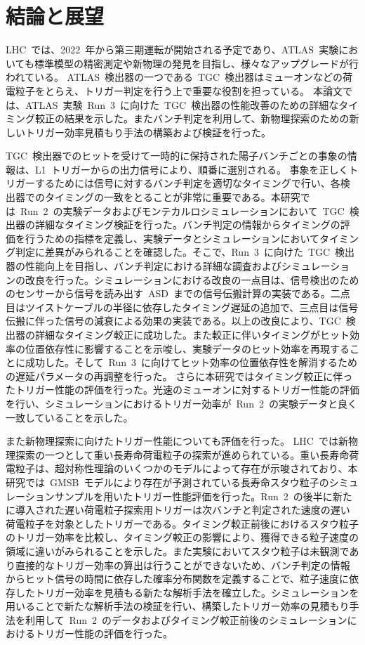 \chapter{結論と展望}
\thispagestyle{empty}
\label{chap:7}
LHC~では、2022~年から第三期運転が開始される予定であり、ATLAS~実験においても標準模型の精密測定や新物理の発見を目指し、様々なアップグレードが行われている。
ATLAS~検出器の一つである~TGC~検出器はミューオンなどの荷電粒子をとらえ、トリガー判定を行う上で重要な役割を担っている。
本論文では、ATLAS~実験~Run~3~に向けた~TGC~検出器の性能改善のための詳細なタイミング較正の結果を示した。またバンチ判定を利用して、新物理探索のための新しいトリガー効率見積もり手法の構築および検証を行った。

TGC~検出器でのヒットを受けて一時的に保持された陽子バンチごとの事象の情報は、L1~トリガーからの出力信号により、順番に選別される。
事象を正しくトリガーするためには信号に対するバンチ判定を適切なタイミングで行い、各検出器でのタイミングの一致をとることが非常に重要である。本研究では~Run~2~の実験データおよびモンテカルロシミュレーションにおいて~TGC~検出器の詳細なタイミング検証を行った。バンチ判定の情報からタイミングの評価を行うための指標を定義し、実験データとシミュレーションにおいてタイミング判定に差異がみられることを確認した。そこで、Run~3~に向けた~TGC~検出器の性能向上を目指し、バンチ判定における詳細な調査およびシミュレーションの改良を行った。シミュレーションにおける改良の一点目は、信号検出のためのセンサーから信号を読み出す~ASD~までの信号伝搬計算の実装である。二点目はツイストケーブルの半径に依存したタイミング遅延の追加で、三点目は信号伝搬に伴った信号の減衰による効果の実装である。以上の改良により、TGC~検出器の詳細なタイミング較正に成功した。また較正に伴いタイミングがヒット効率の位置依存性に影響することを示唆し、実験データのヒット効率を再現することに成功した。そして~Run~3~に向けてヒット効率の位置依存性を解消するための遅延パラメータの再調整を行った。
さらに本研究ではタイミング較正に伴ったトリガー性能の評価を行った。光速のミューオンに対するトリガー性能の評価を行い、シミュレーションにおけるトリガー効率が~Run~2~の実験データと良く一致していることを示した。

また新物理探索に向けたトリガー性能についても評価を行った。
LHC~では新物理探索の一つとして重い長寿命荷電粒子の探索が進められている。重い長寿命荷電粒子は、超対称性理論のいくつかのモデルによって存在が示唆されており、本研究では~GMSB~モデルにより存在が予測されている長寿命スタウ粒子のシミュレーションサンプルを用いたトリガー性能評価を行った。Run~2~の後半に新たに導入された遅い荷電粒子探索用トリガーは次バンチと判定された速度の遅い荷電粒子を対象としたトリガーである。タイミング較正前後におけるスタウ粒子のトリガー効率を比較し、タイミング較正の影響により、獲得できる粒子速度の領域に違いがみられることを示した。また実験においてスタウ粒子は未観測であり直接的なトリガー効率の算出は行うことができないため、バンチ判定の情報からヒット信号の時間に依存した確率分布関数を定義することで、粒子速度に依存したトリガー効率を見積もる新たな解析手法を確立した。シミュレーションを用いることで新たな解析手法の検証を行い、構築したトリガー効率の見積もり手法を利用して~Run~2~のデータおよびタイミング較正前後のシミュレーションにおけるトリガー性能の評価を行った。

